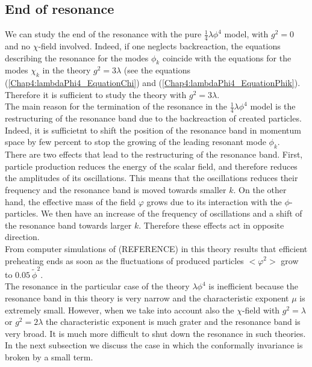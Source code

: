 \documentclass[11pt,a4paper,twoside]{book}
\begin{document}
\subsection{End of resonance}
We can study the end of the resonance with the pure $ \frac{1}{4}\lambda\phi^{4} $ model, with $ g^{2}=0 $ and no $\chi$-field involved. Indeed, if one neglects backreaction, the equations describing the resonance for the modes $\phi_{k}$ coincide with the equations for the modes $\chi_{k}$ in the theory $ g^{2}=3\lambda $ (see the equations (\ref{Chap4:lambdaPhi4_EquationChi}) and (\ref{Chap4:lambdaPhi4_EquationPhik}). Therefore it is sufficient to study the theory with $ g^{2}=3\lambda $.\\
The main reason for the termination of the resonance in the $ \frac{1}{4}\lambda \phi^{4} $ model is the restructuring of the resonance band due to the backreaction of created particles. Indeed, it is sufficietnt to shift the position of the resonance band in momentum space by few percent to stop the growing of the leading resonant mode $\phi_{k}$.\\
There are two effects that lead to the restructuring of the resonance band. First, particle production reduces  the energy  of the scalar field, and therefore reduces the amplitudes of its oscillations. This means that the oscillations reduces their frequency and the resonance band is moved towards smaller $ k $. On the other hand, the effective mass of the field $\varphi$ grows due to its interaction with the $\phi$-particles. We then have an increase of the frequency of oscillations and a shift of the resonance band towards larger $ k $. Therefore these effects act in opposite direction. \\
From computer simulations of (REFERENCE) in this theory results that efficient preheating ends as soon as the fluctuations of produced particles $ <\varphi^{2}> $ grow to $ 0.05\ \tilde{\phi}^{2} $.\\
The  resonance in the particular case  of the theory $ \lambda\phi^{4} $ is inefficient because the resonance band in this theory is very narrow and the characteristic exponent $\mu$ is extremely small. However, when we take into account also the $\chi$-field with $ g^{2}=\lambda $ or $ g^{2}=2\lambda $ the characteristic exponent is much grater and the resonance band is very broad. It is much more difficult to shut down the resonance in such theories.\\
In the next subsection we discuss the case in which the conformally invariance is broken by a small term.
\end{document}
